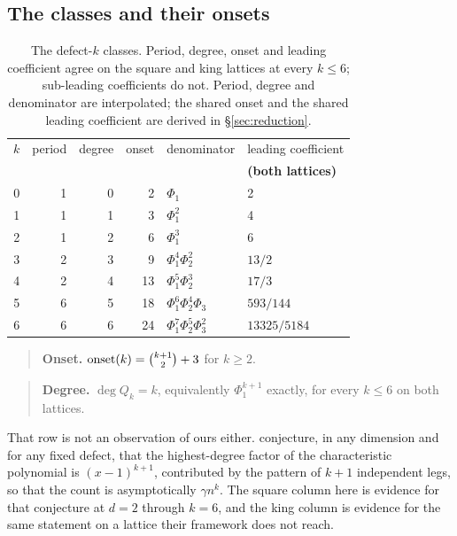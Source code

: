 \documentclass[11pt]{article}
\newcommand{\Phid}{\Phi}
\begin{document}
\subsection{The classes and their onsets}

\begin{table}[H]
\centering\small
\begin{tabular}{r r r r l l}
\toprule
$k$ & period & degree & onset & denominator & leading coefficient \\
& & & & & \textbf{(both lattices)} \\
\midrule
0 & 1 & 0 & 2  & $\Phid_1$ & 2 \\
1 & 1 & 1 & 3  & $\Phid_1^2$ & 4 \\
2 & 1 & 2 & 6  & $\Phid_1^3$ & 6 \\
3 & 2 & 3 & 9  & $\Phid_1^4\Phid_2^2$ & $13/2$ \\
4 & 2 & 4 & 13 & $\Phid_1^5\Phid_2^3$ & $17/3$ \\
5 & 6 & 5 & 18 & $\Phid_1^6\Phid_2^4\Phid_3$ & $593/144$ \\
6 & 6 & 6 & 24 & $\Phid_1^7\Phid_2^5\Phid_3^2$ & $13325/5184$ \\
\bottomrule
\end{tabular}
\caption{The defect-$k$ classes. Period, degree, onset and leading coefficient
agree on the square and king lattices at every $k \le 6$; sub-leading
coefficients do not. Period, degree and denominator are interpolated; the shared
onset and the shared leading coefficient are derived in \S\ref{sec:reduction}.}
\label{tab:maxend}
\end{table}

\begin{quote}
\textbf{Onset.} $\mathrm{onset}(k) = \tbinom{k+1}{2} + 3$ for $k \ge 2$.
\end{quote}

\begin{quote}
\textbf{Degree.} $\deg Q_k = k$, equivalently $\Phid_1^{k+1}$ exactly, for
every $k \le 6$ on both lattices.
\end{quote}

That row is not an observation of ours either. \cite{abz2018} conjecture, in
any dimension and for any fixed defect, that the highest-degree factor of the
characteristic polynomial is $(x-1)^{k+1}$, contributed by the pattern of
$k+1$ independent legs, so that the count is asymptotically $\gamma n^k$.
The square column here is evidence for that conjecture at $d = 2$ through
$k = 6$, and the king column is evidence for the same statement on a lattice
their framework does not reach.
\end{document}
